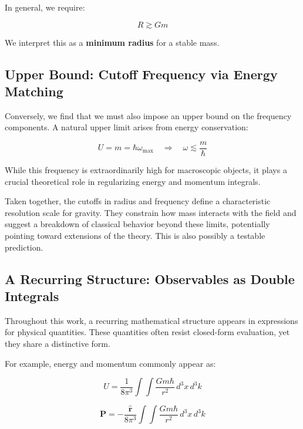 \documentclass {article}
\renewcommand\vec{\mathbf}
\let\OldHat\hat
\renewcommand{\hat}[1]{\OldHat{\mathbf{#1}}}
\begin{document}
In general, we require:

\begin{equation}
R \gtrsim G m
\end{equation}
\label{radius}

We interpret this as a \textbf{minimum radius} for a stable mass. 

\subsection{Upper Bound: Cutoff Frequency via Energy Matching}

Conversely, we find that we must also impose an upper bound on the frequency components.  A natural upper limit arises from energy conservation:


\begin{equation}
U = m = \hbar \omega_{\text{max}} \quad \Rightarrow \quad \omega \lesssim \frac{m}{\hbar}
\end{equation}


While this frequency is extraordinarily high for macroscopic objects, it plays a crucial theoretical role in regularizing energy and momentum integrals. 

\vspace{0.5em}
Taken together, the cutoffs in radius and frequency define a characteristic resolution scale for gravity. They constrain how mass interacts with the field and suggest a breakdown of classical behavior beyond these limits, potentially pointing toward extensions of the theory. This is also possibly a testable prediction.

\subsection{A Recurring Structure: Observables as Double Integrals}
\label{subsec:heuristic}

Throughout this work, a recurring mathematical structure appears in expressions for physical quantities. These quantities often resist closed-form evaluation, yet they share a distinctive form.

For example, energy and momentum commonly appear as:

\begin{equation}
U = \frac{1}{8\pi^3} \int \int \frac{Gm\hbar}{r^2} \, d^3x \, d^3k
\end{equation}

\begin{equation}
\vec{P}  = - \frac{\hat{r}}{8\pi^3} \int \int \frac{Gm\hbar}{r^2} \, d^3x \, d^3k
\end{equation}
\end{document}
